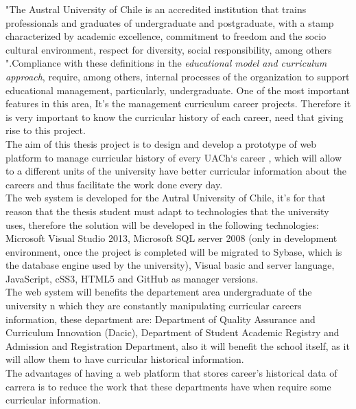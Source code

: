

"The Austral University of Chile is an accredited institution that trains professionals and graduates of undergraduate and postgraduate, with a stamp characterized by academic excellence, commitment to freedom and the socio cultural environment, respect for diversity, social responsibility, among others "\cite{MOD07}.Compliance with these definitions in the \textit{educational model and curriculum approach}, require, among others, internal processes of the organization to support educational management, particularly, undergraduate. One of the most important features in this area, It’s the management curriculum career projects. Therefore it is very important to know the curricular history of each career, need that giving rise to this project.
\\

The aim of this thesis project is to design and develop a prototype of web platform to manage curricular history of every UACh‘s career , which will allow to a different units of the university have better curricular information about the careers and thus facilitate the work done every day.
\\

The web system is developed for the Autral University of Chile, it’s for that reason that the thesis student must adapt to technologies that the university uses, therefore the solution will be developed in the following technologies: Microsoft Visual Studio 2013, Microsoft SQL server 2008 (only in development environment, once the project is completed will be migrated to Sybase, which is the database engine used by the university), Visual basic and server language, JavaScript, cSS3, HTML5 and GitHub as manager versions.
\\

The web system will benefits the departement area undergraduate of the university n which they are constantly manipulating curricular careers information, these department are: Department of Quality Assurance and Curriculum Innovation (Dacic), Department of Student Academic Registry and Admission and Registration Department, also it will benefit the school itself, as it will allow them to have curricular historical information.
\\

The advantages of having a web platform that stores career’s historical data of carrera is to reduce the work that these departments have when require some curricular information.